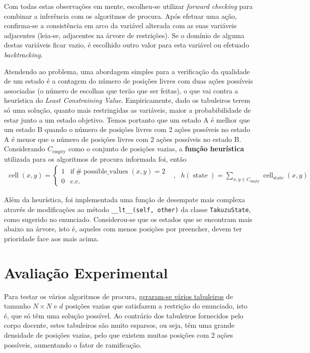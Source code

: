 \documentclass[12pt,a4paper]{article}
\newcommand{\op}{\operatorname}
\begin{document}
Com todas estas observações em mente, escolheu-se utilizar \textit{forward checking} para combinar
a inferência com os algoritmos de procura. Após efetuar uma ação, confirma-se a consistência em arco 
da variável alterada com as suas variáveis adjacentes (leia-se, adjacentes na árvore de restrições).
Se o domínio de alguma destas variáveis ficar vazio, é escolhido outro valor para esta variável ou
efetuado \textit{backtracking}.

Atendendo ao problema, uma abordagem simples para a verificação da qualidade de
um estado é a contagem do número de posições livres com duas ações possíveis
associadas (o número de escolhas que terão que ser feitas), o que vai contra a heurística
do \textit{Least Constraining Value}. Empiricamente, dado os tabuleiros terem só uma solução,
quanto mais restringidas as variáveis, maior a probabibilidade de estar junto a um estado objetivo. 
Temos portanto que um estado A é melhor que um estado B quando
o número de posições livres com 2 ações possíveis no estado A é menor que
o número de posições livres com 2 ações possíveis no estado B.
Considerando \(C_{\op{empty}}\) como o conjunto de posições vazias, a
\textbf{função heurística} utilizada para os algoritmos de procura informada foi, então
\vspace{-0.3cm}
\[
  \begin{aligned}
    \op{cell}(x, y) = \begin{cases}
                        1 & \text{if}~\#\op{possible\_values}(x, y) = 2 \\
                        0 & \text{c.c.}
                      \end{cases}
     & , &
    h(\op{state}) = \sum_{x,y\in C_{\op{empty}}} \op{cell}_{\op{state}}(x, y)
  \end{aligned}
\]

Além da heurística, foi implementada uma função de desempate mais complexa através de
modificações ao método \texttt{\_\_lt\_\_(self, other)} da classe \texttt{TakuzuState}, como sugerido no enunciado.
Considerou-se que os estados que se encontram mais abaixo na árvore, isto é, aqueles com
menos posições por preencher, devem ter prioridade face aos mais acima.

\section{Avaliação Experimental}

Para testar os vários algoritmos de procura,
\href{https://gist.github.com/D-Card/68d32c6371abfce61dc5bbaabd633f27}{geraram-se vários tabuleiros} de tamanho \(N \times N\)
e \(d\) posições vazias que satisfazem a restrição do enunciado, isto é, que só têm uma solução possível.
Ao contrário dos tabuleiros fornecidos pelo corpo docente, estes tabuleiros são muito
esparsos, ou seja, têm uma grande densidade de posições vazias, pelo que existem muitas
posições com 2 ações possíveis, aumentando o fator de ramificação.
\end{document}
